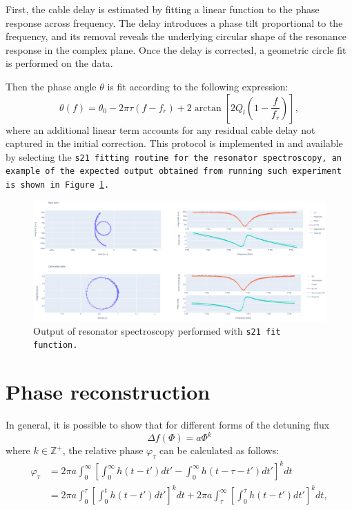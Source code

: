 First, the cable delay is estimated by fitting a linear function to the phase response across frequency. 
The delay introduces a phase tilt proportional to the frequency, and its removal reveals the underlying circular shape of the resonance response in the complex plane. 
Once the delay is corrected, a geometric circle fit is performed on the data.

Then the phase angle $\theta$ is fit according to the following expression:
\begin{equation}
    \theta(f) = \theta_0 - 2\pi \tau (f - f_r) + 2 \arctan \left[ 2 Q_l \left( 1 - \frac{f}{f_r} \right) \right],
\end{equation}
where an additional linear term accounts for any residual cable delay not captured in the initial correction. 
This protocol is implemented in \Qibocal and available by selecting the \tt{s21} fitting routine for the resonator spectroscopy, an example of the expected output obtained from running such experiment is shown in Figure \ref{fig:res_s21}.

\begin{figure}[ht!]
    \centering
    \includegraphics[width=\textwidth]{figures/png/s21.png}
    \caption{Output of resonator spectroscopy performed with \tt{s21} fit function.}
    \label{fig:res_s21}
\end{figure}

\chapter{Phase reconstruction}
\label{app:phase_rec}

In general, it is possible to show that for different forms of the detuning flux 
\begin{equation}\label{eq:det_flux}
    \Delta f(\Phi) = a\Phi^k
\end{equation}
where $k \in \mathbb{Z}^+$, the relative phase $\varphi_{\tau}$ can be calculated as follows:
\begin{align}
    \varphi_\tau &= 2\pi a \int_{0}^{\infty} \left[ \int_{0}^{\infty} h(t - t') dt' - \int_{0}^{\infty} h(t - \tau - t') dt' \right]^k dt \\
    &= 2\pi a \int_{0}^{\tau} \left[ \int_{0}^{t} h(t - t') dt' \right]^k dt + 2\pi a \int_{\tau}^{\infty} \left[ \int_{0}^{\tau} h(t - t') dt' \right]^k dt,
\end{align}

